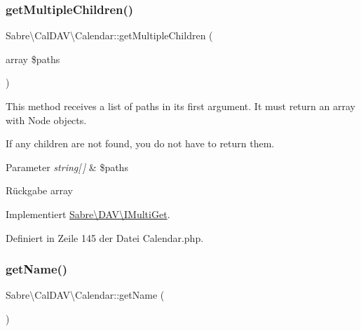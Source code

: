 \mbox{\label{class_sabre_1_1_cal_d_a_v_1_1_calendar_a9f26acb24cd7aa4059efc96489337a0b}} 
\subsubsection{\texorpdfstring{get\+Multiple\+Children()}{getMultipleChildren()}}
{\footnotesize\ttfamily Sabre\textbackslash{}\+Cal\+D\+A\+V\textbackslash{}\+Calendar\+::get\+Multiple\+Children (\begin{DoxyParamCaption}\item[{array}]{\$paths }\end{DoxyParamCaption})}

This method receives a list of paths in it\textquotesingle{}s first argument. It must return an array with Node objects.

If any children are not found, you do not have to return them.


\begin{DoxyParams}{Parameter}
{\em string\mbox{[}$\,$\mbox{]}} & \$paths \\
\hline
\end{DoxyParams}
\begin{DoxyReturn}{Rückgabe}
array 
\end{DoxyReturn}


Implementiert \mbox{\hyperlink{interface_sabre_1_1_d_a_v_1_1_i_multi_get_a4d66db5c26d9247511687cd277799528}{Sabre\textbackslash{}\+D\+A\+V\textbackslash{}\+I\+Multi\+Get}}.



Definiert in Zeile 145 der Datei Calendar.\+php.

\mbox{\label{class_sabre_1_1_cal_d_a_v_1_1_calendar_ab6aa53fc6718604840c91f6842573382}} 
\subsubsection{\texorpdfstring{get\+Name()}{getName()}}
{\footnotesize\ttfamily Sabre\textbackslash{}\+Cal\+D\+A\+V\textbackslash{}\+Calendar\+::get\+Name (\begin{DoxyParamCaption}{ }\end{DoxyParamCaption})}

